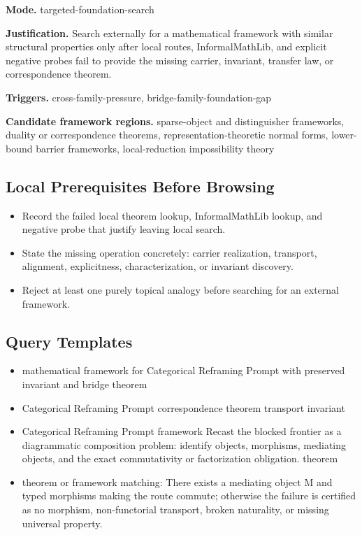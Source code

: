 \documentclass[11pt]{article}
\begin{document}
\textbf{Mode.} targeted-foundation-search

\textbf{Justification.} Search externally for a mathematical framework with similar structural properties only after local routes, InformalMathLib, and explicit negative probes fail to provide the missing carrier, invariant, transfer law, or correspondence theorem.

\textbf{Triggers.} cross-family-pressure, bridge-family-foundation-gap

\textbf{Candidate framework regions.} sparse-object and distinguisher frameworks, duality or correspondence theorems, representation-theoretic normal forms, lower-bound barrier frameworks, local-reduction impossibility theory

\subsection*{Local Prerequisites Before Browsing}
\begin{itemize}[leftmargin=*,itemsep=0.2em]
\item Record the failed local theorem lookup, InformalMathLib lookup, and negative probe that justify leaving local search.
\item State the missing operation concretely: carrier realization, transport, alignment, explicitness, characterization, or invariant discovery.
\item Reject at least one purely topical analogy before searching for an external framework.
\end{itemize}
\subsection*{Query Templates}
\begin{itemize}[leftmargin=*,itemsep=0.2em]
\item mathematical framework for Categorical Reframing Prompt with preserved invariant and bridge theorem
\item Categorical Reframing Prompt correspondence theorem transport invariant
\item Categorical Reframing Prompt framework Recast the blocked frontier as a diagrammatic composition problem: identify objects, morphisms, mediating objects, and the exact commutativity or factorization obligation. theorem
\item theorem or framework matching: There exists a mediating object M and typed morphisms making the route commute; otherwise the failure is certified as no morphism, non-functorial transport, broken naturality, or missing universal property.
\end{itemize}
\end{document}

